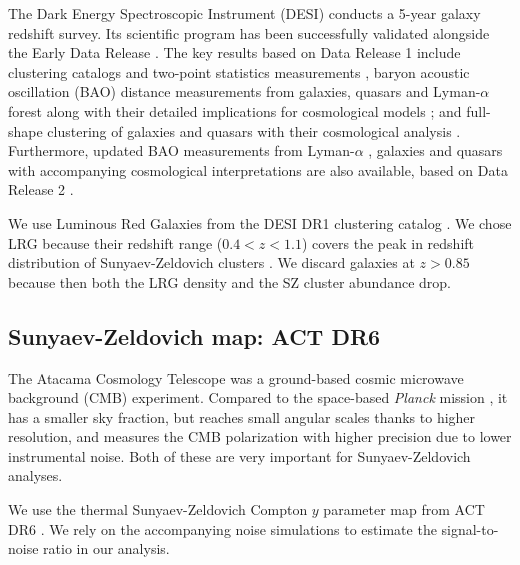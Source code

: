 The Dark Energy Spectroscopic Instrument (DESI) \citep{DESI2016a.Science,DESI2022.KP1.Instr} conducts a 5-year galaxy redshift survey.
Its scientific program has been successfully validated \citep{DESI2023a.KP1.SV} alongside the Early Data Release \citep{DESI2023b.KP1.EDR}.
The key results based on Data Release 1 \citep[recently made public]{DESI2024.I.DR1} include clustering catalogs and two-point statistics measurements \citep{DESI2024.II.KP3}, baryon acoustic oscillation (BAO) distance measurements from galaxies, quasars \citep{DESI2024.III.KP4} and Lyman-$\alpha$ forest \citep{DESI2024.IV.KP6} along with their detailed implications for cosmological models \citep{DESI2024.VI.KP7A}; and full-shape clustering of galaxies and quasars \citep{DESI2024.V.KP5} with their cosmological analysis \citep{DESI2024.VII.KP7B}.
Furthermore, updated BAO measurements from Lyman-$\alpha$ \citep{DESI.DR2.BAO.lya}, galaxies and quasars with accompanying cosmological interpretations \citep{DESI.DR2.BAO.cosmo} are also available, based on Data Release 2 \citep{DESI.DR2.DR2}.

We use Luminous Red Galaxies \citep[LRG;][]{LRG.TS.Zhou.2023} from the DESI DR1 clustering catalog \citep{DESI2024.II.KP3,DESI2024.I.DR1}.
We chose LRG because their redshift range ($0.4<z<1.1$) covers the peak in redshift distribution of Sunyaev-Zeldovich clusters \citep{ACT-SZ-clusters-DR5}.
We discard galaxies at $z>0.85$ because then both the LRG density \citep{DESI2024.II.KP3} and the SZ cluster abundance \citep{ACT-SZ-clusters-DR5} drop.

\subsection{Sunyaev-Zeldovich map: ACT DR6}

The Atacama Cosmology Telescope \citep[ACT;][]{ACT-design,ACT} was a ground-based cosmic microwave background (CMB) experiment.
Compared to the space-based {\it Planck} mission \citep{planck_overview}, it has a smaller sky fraction, but reaches small angular scales thanks to higher resolution, and measures the CMB polarization with higher precision due to lower instrumental noise.
Both of these are very important for Sunyaev-Zeldovich analyses.

We use the thermal Sunyaev-Zeldovich Compton $y$ parameter map from ACT DR6 \citep{ACT-maps-DR6}.
We rely on the accompanying noise simulations \citep{ACT-noise-simulations-DR6} to estimate the signal-to-noise ratio in our analysis.

